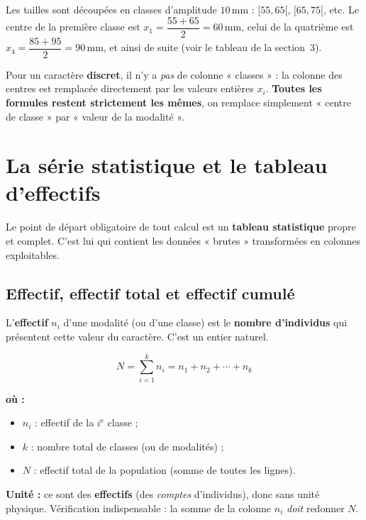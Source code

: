 \documentclass[11pt,a4paper]{article}
\newenvironment{ou}{%
  \par\smallskip\noindent\textbf{où :}\nopagebreak
  \begin{itemize}[leftmargin=1.8em,topsep=2pt,itemsep=1.5pt,parsep=0pt]}%
  {\end{itemize}}
\begin{document}
\begin{exemple}
Les tailles sont découpées en classes d'amplitude $10$\,mm : $[55,65[$, $[65,75[$, etc.
Le centre de la première classe est
$x_1=\dfrac{55+65}{2}=60$\,mm, celui de la quatrième est $x_4=\dfrac{85+95}{2}=90$\,mm, et ainsi de
suite (voir le tableau de la section~3).
\end{exemple}

\begin{remarque}
Pour un caractère \textbf{discret}, il n'y a \emph{pas} de colonne « classes » : la colonne des
centres est remplacée directement par les valeurs entières $x_i$. \textbf{Toutes les formules
restent strictement les mêmes}, on remplace simplement « centre de classe » par « valeur de la
modalité ».
\end{remarque}

\section{La série statistique et le tableau d'effectifs}
Le point de départ obligatoire de tout calcul est un \textbf{tableau statistique} propre et complet.
C'est lui qui contient les données « brutes » transformées en colonnes exploitables.

\subsection{Effectif, effectif total et effectif cumulé}

\begin{definition}[effectif]
L'\textbf{effectif} $n_i$ d'une modalité (ou d'une classe) est le \textbf{nombre d'individus} qui
présentent cette valeur du caractère. C'est un entier naturel.
\end{definition}

\begin{formule}
\[
N=\sum_{i=1}^{k} n_i = n_1+n_2+\cdots+n_k
\]
\begin{ou}
  \item $n_i$ : effectif de la $i^{\text{e}}$ classe ;
  \item $k$ : nombre total de classes (ou de modalités) ;
  \item $N$ : effectif total de la population (somme de toutes les lignes).
\end{ou}
\textbf{Unité :} ce sont des \textbf{effectifs} (des \emph{comptes} d'individus), donc sans unité
physique. Vérification indispensable : la somme de la colonne $n_i$ \emph{doit} redonner $N$.
\end{formule}
\end{document}
